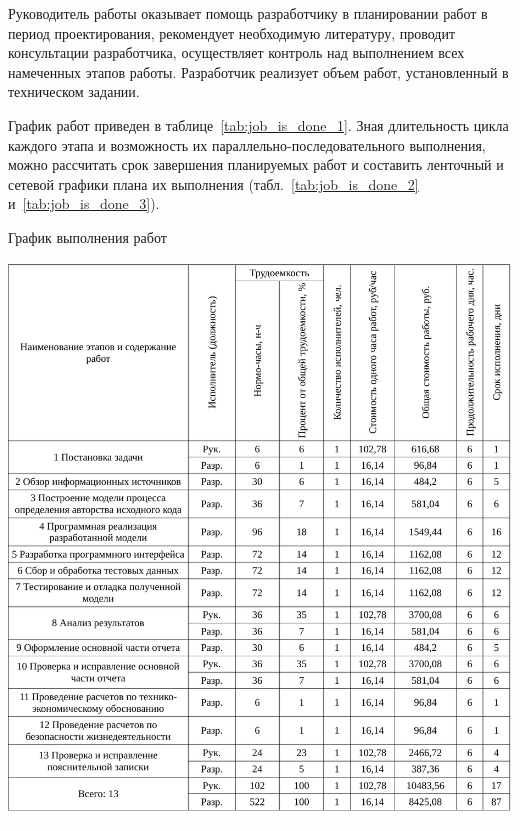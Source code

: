 Руководитель работы оказывает помощь разработчику в планировании работ в период проектирования, рекомендует
необходимую литературу, проводит консультации разработчика, осуществляет контроль над выполнением всех 
намеченных этапов работы. Разработчик реализует объем работ, установленный в техническом задании.

График работ приведен в таблице~\ref{tab:job_is_done_1}. Зная длительность цикла каждого этапа и возможность их параллельно-последовательного выполнения, можно рассчитать срок завершения 
планируемых работ и составить ленточный и сетевой графики плана их выполнения (табл.~\ref{tab:job_is_done_2} и~\ref{tab:job_is_done_3}).

\begin{table}[!ht]
\caption{График выполнения работ}
\centering
\includegraphics[page=1, width=1\linewidth]{tables/economics/schedule.pdf}
\label{tab:job_is_done_1}
\end{table}


